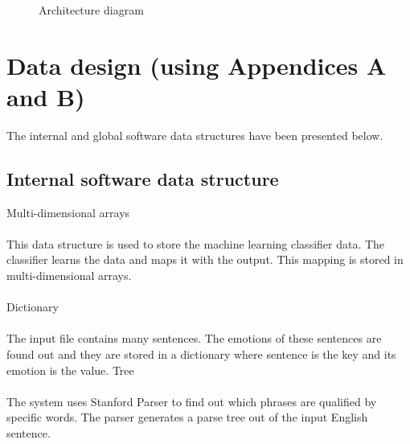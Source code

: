 \documentclass[oneside,a4paper,12pt]{book}
\begin{document}
 
  \begin{center}
	\begin{figure}[!htbp]
		\centering
	  \caption{Architecture diagram}
	  \label{fig:arch-dig}
	\end{figure}
\end{center} 


\section{Data design (using Appendices A and B)}
The internal and global software data structures have been presented below.
\subsection{Internal software data structure}
Multi-dimensional arrays\\\\
This data structure is used to store the machine learning classifier data. The classifier learns the data and maps it with the output. This mapping is stored in multi-dimensional arrays.\\\\
Dictionary\\\\
The input file contains many sentences. The emotions of these sentences are found out and they are stored in a dictionary where sentence is the key and its emotion is the value.
Tree\\\\
The system uses Stanford Parser to find out which phrases are qualified by specific words. The parser generates a parse tree out of the input English sentence.
\end{document}
